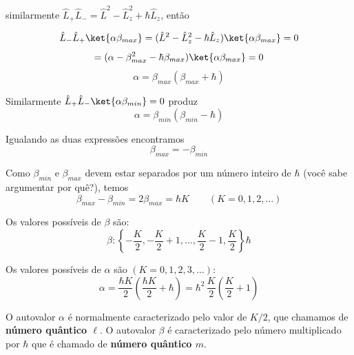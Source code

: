 similarmente $\hat{L}_+ \hat{L}_- = \hat{L}^2 - \hat{L}_z^2 + \hbar \hat{L}_z$, então

\begin{equation}
    \hat{L}_- \hat{L}_+ \ket{\alpha\beta_{max}} = (\hat{L}^2 - \hat{L}_z^2 - \hbar \hat{L}_z) \ket{\alpha\beta_{max}} = 0
\label{eq:aula20_LmenosLmais_betamax}
\end{equation}
\begin{equation}
    = (\alpha - \beta_{max}^2 - \hbar\beta_{max}) \ket{\alpha\beta_{max}} = 0
\label{eq:aula20_LmenosLmais_betamax2}
\end{equation}
\begin{equation}
    \alpha = \beta_{max}(\beta_{max} + \hbar)
\label{eq:aula20_alpha_betamax}
\end{equation}

Similarmente $\hat{L}_+ \hat{L}_- \ket{\alpha\beta_{min}} = 0$ produz
\begin{equation}
    \alpha = \beta_{min}(\beta_{min} - \hbar)
\label{eq:aula20_alpha_betamin}
\end{equation}

Igualando as duas expressões encontramos
\begin{equation}
    \beta_{max} = -\beta_{min}
\label{eq:aula20_betamax_betamin}
\end{equation}

Como $\beta_{min}$ e $\beta_{max}$ devem estar separados por um número inteiro de $\hbar$ (você sabe argumentar por quê?), temos
\begin{equation}
    \beta_{max} - \beta_{min} = 2\beta_{max} = \hbar K \qquad (K = 0, 1, 2, \dots)
\label{eq:aula20_betamax_K}
\end{equation}

Os valores possíveis de $\beta$ são:
\begin{equation}
    \boxed{\beta : \left\{ -\frac{K}{2}, -\frac{K}{2}+1, \dots, \frac{K}{2}-1, \frac{K}{2} \right\} \hbar}
\label{eq:aula20_valores_beta}
\end{equation}

Os valores possíveis de $\alpha$ são $(K = 0, 1, 2, 3, \dots)$:
\begin{equation}
    \alpha = \frac{\hbar K}{2}\left( \frac{\hbar K}{2} + \hbar \right) = \boxed{\hbar^2 \, \frac{K}{2}\left(\frac{K}{2}+1\right)}
\label{eq:aula20_valores_alpha}
\end{equation}

O autovalor $\alpha$ é normalmente caracterizado pelo valor de $K/2$, que chamamos de \textbf{número quântico $\ell$}. O autovalor $\beta$ é caracterizado pelo número multiplicado por $\hbar$ que é chamado de \textbf{número quântico $m$}.

